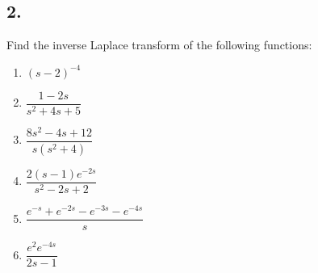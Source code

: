\subsection*{2. }
Find the inverse Laplace transform of the following functions:
\begin{multicols}{2}
	\begin{enumerate}
		\item $(s-2)^{-4}$\\
		\item $\dfrac{1-2s}{s^2 + 4s + 5}$ \\
		\item $\dfrac{8s^2 - 4s + 12}{s(s^2 + 4)}$\\
		\item $\dfrac{2(s-1) e^{-2s}}{s^2 - 2s + 2}$\\
		\item $\dfrac{e^{-s}+ e^{-2s} - e^{-3s} - e^{-4s}}{s}$\\
		\item $\dfrac{e^2 e^{-4s}}{2s-1}$\\
	\end{enumerate}
\end{multicols}





